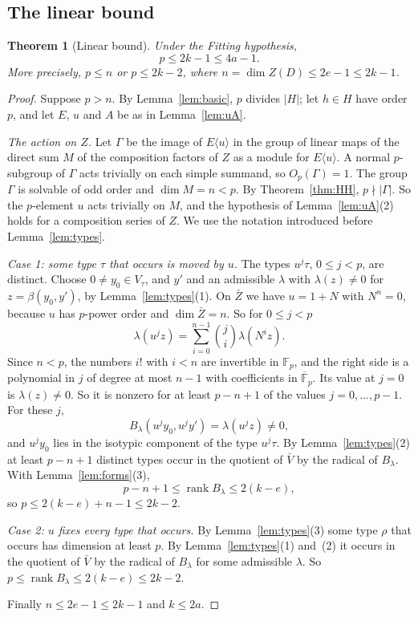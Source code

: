 \documentclass[11pt]{amsart}
\newtheorem{theorem}{Theorem}
\theoremstyle{definition}
\theoremstyle{remark}
\newcommand{\F}{\mathbb{F}}
\newcommand{\rank}{\operatorname{rank}}
\newcommand{\Kb}{\overline{\F}_p}
\begin{document}
\subsection{The linear bound}

\begin{theorem}[Linear bound]\label{thm:linear}
Under the Fitting hypothesis,
\[
p\le2k-1\le4a-1 .
\]
More precisely, $p\le n$ or $p\le2k-2$, where $n=\dim Z(D)\le2e-1\le2k-1$.
\end{theorem}
\begin{proof}
Suppose $p>n$. By Lemma~\ref{lem:basic}, $p$ divides $|H|$; let $h\in H$ have order $p$, and let $E$, $u$ and $A$ be as in Lemma~\ref{lem:uA}.

\emph{The action on $Z$.} Let $\Gamma$ be the image of $E\langle u\rangle$ in the group of linear maps of the direct sum $M$ of the composition factors of $Z$ as a module for $E\langle u\rangle$. A normal $p$-subgroup of $\Gamma$ acts trivially on each simple summand, so $O_p(\Gamma)=1$. The group $\Gamma$ is solvable of odd order and $\dim M=n<p$. By Theorem~\ref{thm:HH}, $p\nmid|\Gamma|$. So the $p$-element $u$ acts trivially on $M$, and the hypothesis of Lemma~\ref{lem:uA}(2) holds for a composition series of $Z$. We use the notation introduced before Lemma~\ref{lem:types}.

\emph{Case 1: some type $\tau$ that occurs is moved by $u$.} The types $u^j\tau$, $0\le j<p$, are distinct. Choose $0\ne y_0\in V_\tau$, and $y'$ and an admissible $\lambda$ with $\lambda(z)\ne0$ for $z=\beta(y_0,y')$, by Lemma~\ref{lem:types}(1). On $\bar Z$ we have $u=1+N$ with $N^n=0$, because $u$ has $p$-power order and $\dim\bar Z=n$. So for $0\le j<p$
\[
\lambda(u^jz)=\sum_{i=0}^{n-1}\binom ji\lambda(N^iz).
\]
Since $n<p$, the numbers $i!$ with $i<n$ are invertible in $\F_p$, and the right side is a polynomial in $j$ of degree at most $n-1$ with coefficients in $\Kb$. Its value at $j=0$ is $\lambda(z)\ne0$. So it is nonzero for at least $p-n+1$ of the values $j=0,\dots,p-1$. For these $j$,
\[
B_\lambda(u^jy_0,u^jy')=\lambda(u^jz)\ne0,
\]
and $u^jy_0$ lies in the isotypic component of the type $u^j\tau$. By Lemma~\ref{lem:types}(2) at least $p-n+1$ distinct types occur in the quotient of $\bar V$ by the radical of $B_\lambda$. With Lemma~\ref{lem:forms}(3),
\[
p-n+1\le\rank B_\lambda\le2(k-e),
\]
so $p\le2(k-e)+n-1\le2k-2$.

\emph{Case 2: $u$ fixes every type that occurs.} By Lemma~\ref{lem:types}(3) some type $\rho$ that occurs has dimension at least $p$. By Lemma~\ref{lem:types}(1) and~(2) it occurs in the quotient of $\bar V$ by the radical of $B_\lambda$ for some admissible $\lambda$. So $p\le\rank B_\lambda\le2(k-e)\le2k-2$.

Finally $n\le2e-1\le2k-1$ and $k\le2a$.
\end{proof}
\end{document}
